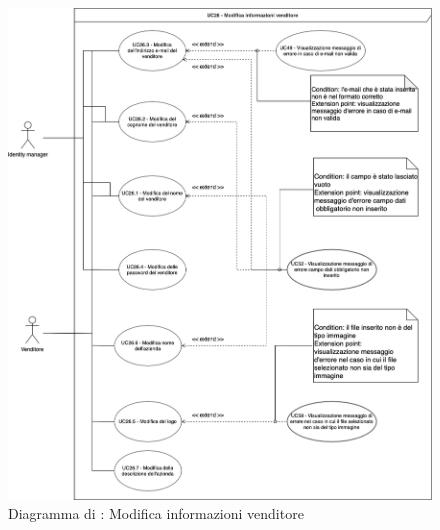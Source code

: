 \label{modifica-informazioni-venditore}

\begin{figure}[H]
    \centering
    \includegraphics[scale=0.4]{Immagini/DiagrammiUC/Venditore/ModificaInformazioniVenditore.png}
    \caption{Diagramma di \actualUC: Modifica informazioni venditore}
    \label{fig:modifica-informazioni-venditore}
\end{figure}

